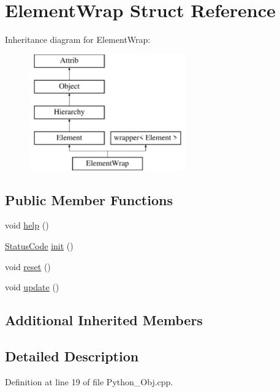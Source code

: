 \hypertarget{structElementWrap}{}\section{Element\+Wrap Struct Reference}
\label{structElementWrap}
Inheritance diagram for Element\+Wrap\+:\begin{figure}[H]
\begin{center}
\leavevmode
\includegraphics[height=5.000000cm]{structElementWrap}
\end{center}
\end{figure}
\subsection*{Public Member Functions}
\begin{DoxyCompactItemize}
\item 
void \hyperlink{structElementWrap_ad22ed533c2dad73f8650243d8060b547}{help} ()
\item 
\hyperlink{classStatusCode}{Status\+Code} \hyperlink{structElementWrap_a5e0ca7bd04cfb1f7582fc80c065fd376}{init} ()
\item 
void \hyperlink{structElementWrap_a69a4588be73b8c85ddb92b13f74c3a12}{reset} ()
\item 
void \hyperlink{structElementWrap_a13d2d2771d1dd305abf3457f98482cbe}{update} ()
\end{DoxyCompactItemize}
\subsection*{Additional Inherited Members}


\subsection{Detailed Description}


Definition at line 19 of file Python\+\_\+\+Obj.\+cpp.



